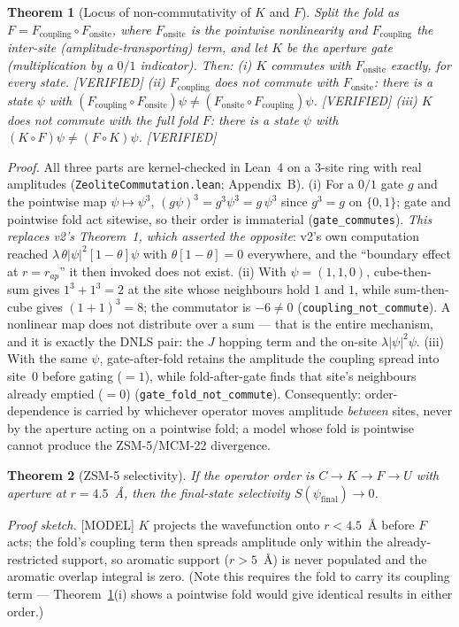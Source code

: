 \documentclass[11pt]{article}
\newtheorem{theorem}{Theorem}
\begin{document}
\begin{theorem}[Locus of non-commutativity of $K$ and $F$]
\label{thm:locus}
Split the fold as $F = F_{\mathrm{coupling}} \circ F_{\mathrm{onsite}}$, where $F_{\mathrm{onsite}}$ is the pointwise nonlinearity and $F_{\mathrm{coupling}}$ the inter-site (amplitude-transporting) term, and let $K$ be the aperture gate (multiplication by a $0/1$ indicator). Then:
(i) $K$ commutes with $F_{\mathrm{onsite}}$ exactly, for every state. \textnormal{[VERIFIED]}
(ii) $F_{\mathrm{coupling}}$ does not commute with $F_{\mathrm{onsite}}$: there is a state $\psi$ with $(F_{\mathrm{coupling}} \circ F_{\mathrm{onsite}})\psi \neq (F_{\mathrm{onsite}} \circ F_{\mathrm{coupling}})\psi$. \textnormal{[VERIFIED]}
(iii) $K$ does not commute with the full fold $F$: there is a state $\psi$ with $(K \circ F)\psi \neq (F \circ K)\psi$. \textnormal{[VERIFIED]}
\end{theorem}
\emph{Proof.} All three parts are kernel-checked in Lean~4 on a 3-site ring with real amplitudes (\texttt{ZeoliteCommutation.lean}; Appendix~B). (i) For a $0/1$ gate $g$ and the pointwise map $\psi \mapsto \psi^3$, $(g\psi)^3 = g^3\psi^3 = g\,\psi^3$ since $g^3=g$ on $\{0,1\}$; gate and pointwise fold act sitewise, so their order is immaterial (\texttt{gate\_commutes}). \emph{This replaces v2's Theorem~1, which asserted the opposite}: v2's own computation reached $\lambda\,\theta|\psi|^2[1-\theta]\psi$ with $\theta[1-\theta]=0$ everywhere, and the ``boundary effect at $r=r_{ap}$'' it then invoked does not exist. (ii) With $\psi=(1,1,0)$, cube-then-sum gives $1^3+1^3=2$ at the site whose neighbours hold $1$ and $1$, while sum-then-cube gives $(1+1)^3=8$; the commutator is $-6\neq 0$ (\texttt{coupling\_not\_commute}). A nonlinear map does not distribute over a sum --- that is the entire mechanism, and it is exactly the DNLS pair: the $J$ hopping term and the on-site $\lambda|\psi|^2\psi$. (iii) With the same $\psi$, gate-after-fold retains the amplitude the coupling spread into site~0 before gating ($=1$), while fold-after-gate finds that site's neighbours already emptied ($=0$) (\texttt{gate\_fold\_not\_commute}). Consequently: order-dependence is carried by whichever operator moves amplitude \emph{between} sites, never by the aperture acting on a pointwise fold; a model whose fold is pointwise cannot produce the ZSM-5/MCM-22 divergence.

\begin{theorem}[ZSM-5 selectivity]
If the operator order is $C \to K \to F \to U$ with aperture at $r=4.5$~\AA, then the final-state selectivity $S(\psi_{\mathrm{final}}) \to 0$.
\end{theorem}
\emph{Proof sketch.} \textnormal{[MODEL]} $K$ projects the wavefunction onto $r<4.5$~\AA{} before $F$ acts; the fold's coupling term then spreads amplitude only within the already-restricted support, so aromatic support ($r>5$~\AA) is never populated and the aromatic overlap integral is zero. (Note this requires the fold to carry its coupling term --- Theorem~\ref{thm:locus}(i) shows a pointwise fold would give identical results in either order.)
\end{document}
